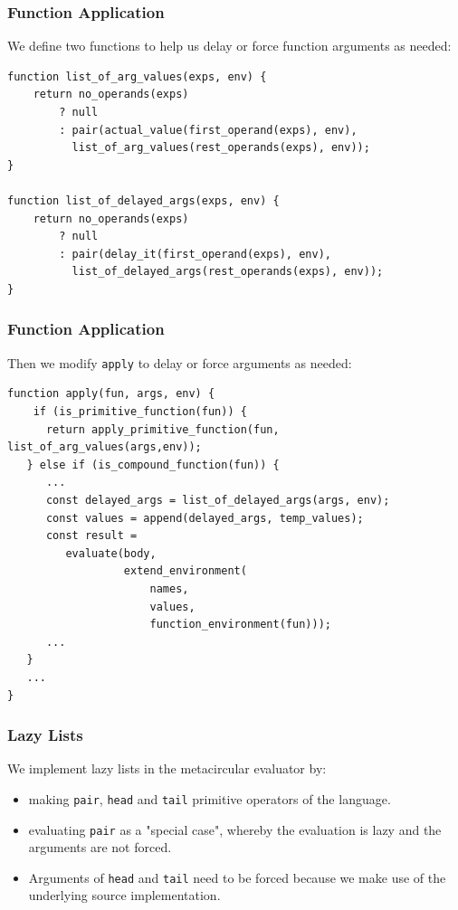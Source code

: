 \documentclass[12pt]{beamer}
\begin{document}
\begin{frame}[fragile]
\frametitle{Function Application}
We define two functions to help us delay or force function arguments as needed:
\begin{lstlisting}
function list_of_arg_values(exps, env) {
    return no_operands(exps)
        ? null
        : pair(actual_value(first_operand(exps), env),
          list_of_arg_values(rest_operands(exps), env));
}

function list_of_delayed_args(exps, env) {
    return no_operands(exps)
        ? null
        : pair(delay_it(first_operand(exps), env),
          list_of_delayed_args(rest_operands(exps), env));
}
\end{lstlisting}
\end{frame}

\begin{frame}[fragile]
\frametitle{Function Application}
Then we modify \texttt{apply} to delay or force arguments as needed:
\begin{lstlisting}
function apply(fun, args, env) {
    if (is_primitive_function(fun)) {
      return apply_primitive_function(fun, list_of_arg_values(args,env));
   } else if (is_compound_function(fun)) {
      ...
      const delayed_args = list_of_delayed_args(args, env);
      const values = append(delayed_args, temp_values);			   
      const result =
         evaluate(body,
                  extend_environment(
                      names,
                      values,
                      function_environment(fun)));
      ...
   }
   ...
}
\end{lstlisting}
\end{frame}

\begin{frame}[fragile]
\frametitle{Lazy Lists}
We implement lazy lists in the metacircular evaluator by:
\begin{itemize}
\item<1->making  \texttt{pair}, \texttt{head} and \texttt{tail} primitive operators of the language. 
\item<2->evaluating \texttt{pair} as a "special case", whereby the evaluation is lazy and the arguments are not forced.
\item<3->Arguments of \texttt{head} and \texttt{tail} need to be forced because we make use of the underlying source implementation.
\end{itemize}
\end{frame}
\end{document}
